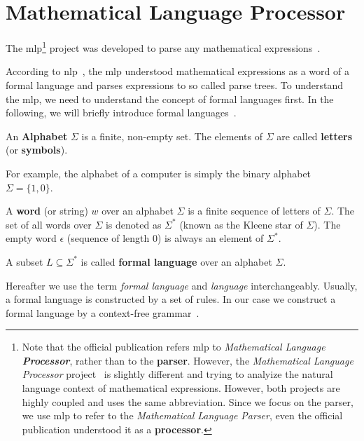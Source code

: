 \section{Mathematical Language Processor}\label{sec:mlp}
The \gls{mlp}\footnote{Note that the official publication refers \gls{mlp} to \textit{Mathematical Language \textbf{Processor}}, rather than to the \textbf{parser}. However, the \textit{Mathematical Language Processor} project~\cite{MLP:Project} is slightly different and trying to analyize the natural language context of mathematical expressions. However, both projects are highly coupled and uses the same abbreviation. Since we focus on the parser, we use \gls{mlp} to refer to the \textit{Mathematical Language Parser}, even the official publication understood it as a \textbf{processor}.} project was developed to parse any mathematical expressions~\cite{POM-Tagger}. 

According to \gls{nlp}~\cite{NLP}, the \gls{mlp} understood mathematical expressions as a word of a formal language and parses expressions to so called parse trees. To understand the \gls{mlp}, we need to understand the concept of formal languages first. In the following, we will briefly introduce formal languages~\cite{Math:Encyclopedia:FormalLanguage}.

\begin{definition}[Alphabet]
An \textbf{Alphabet} $\Sigma$ is a finite, non-empty set. The elements of $\Sigma$ are called \textbf{letters} (or \textbf{symbols}).
\end{definition}

For example, the alphabet of a computer is simply the binary alphabet $\Sigma = \{1,0\}$.

\begin{definition}[Word]
A \textbf{word} (or string) $w$ over an alphabet $\Sigma$ is a finite sequence of letters of $\Sigma$. The set of all words over $\Sigma$ is denoted as $\Sigma^\ast$ (known as the Kleene star of $\Sigma$). The empty word $\epsilon$ (sequence of length 0) is always an element of $\Sigma^\ast$.
\end{definition}

\begin{definition}
A subset $L \subseteq \Sigma^\ast$ is called \textbf{formal language} over an alphabet $\Sigma$.
\end{definition}

Hereafter we use the term \textit{formal language} and \textit{language} interchangeably. Usually, a formal language is constructed by a set of rules. In our case we construct a formal language by a context-free grammar~\cites[79]{Grammar}{IntroComp}.

